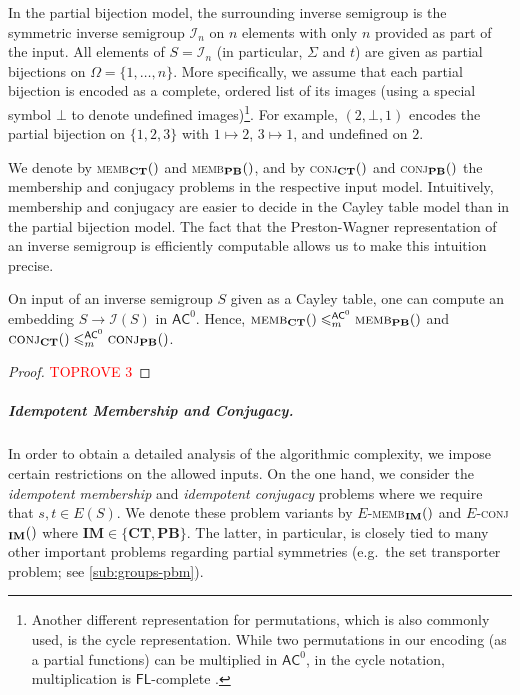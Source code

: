 \documentclass[anonymous,letter,UKenglish,cleveref,autoref,thm-restate]{lipics-v2021}
\renewcommand{\leq}{\leqslant}
\newcommand{\eg}{e.g.~}
\newcommand{\ACz}{\ensuremath{\mathsf{AC}^0}\xspace}
\newcommand{\ISym}{\cI}
\newcommand{\cI}{\mathcal{I}}
\theoremstyle{plain}
\theoremstyle{plain}
\newcommand{\dMemb}[2][]{\textup{\textsc{memb${}_{\mathbf{#1}}\expandafter\ifx\expandafter\relax\detokenize{#2}\relax\else(#2)\fi$}}}
\newcommand{\dConj}[2][]{\textup{\textsc{conj${}_{\mathbf{#1}}\expandafter\ifx\expandafter\relax\detokenize{#2}\relax\else(#2)\fi$}}}
\newcommand{\dEMemb}[2][]{\ensuremath{E}\textnormal{-}\dMemb[#1]{#2}}
\newcommand{\dEConj}[2][]{\ensuremath{E}\textnormal{-}\dConj[#1]{#2}}
\newcommand{\mysubparagraph}[1]{\vspace*{-2mm}\subparagraph*{#1}}
\begin{document}
In the partial bijection model, the surrounding inverse semigroup is the symmetric inverse semigroup $\ISym_n$ on $n$ elements with only $n$ provided as part of the input.
All elements of $S = \ISym_n$ (in particular, $\Sigma$ and $t$) are given as partial bijections on $\Omega = \{ 1, \dotsc, n\}$.
More specifically, we assume that each partial bijection is encoded as a complete, ordered list of its images (using a special symbol $\bot$ to denote undefined images)\footnote{Another different representation for permutations, which is also commonly used, is the cycle representation. While two permutations in our encoding (as a partial functions) can be multiplied in \ACz, in the cycle notation, multiplication is $\mathsf{FL}$-complete \cite{CookM87}.}.
For example, $(2,\bot,1)$ encodes the partial bijection on $\{1,2,3\}$ with $1 \mapsto 2$, $3 \mapsto 1$, and undefined on $2$.

We denote by \dMemb[CT]{} and \dMemb[PB]{}, and by \dConj[CT]{} and \dConj[PB]{} the membership and conjugacy problems in the respective input model.
Intuitively, membership and conjugacy are easier to decide in the Cayley table model than in the partial bijection model. 
The fact that the Preston-Wagner representation \cite{Preston54,Wagner52} of an inverse semigroup is efficiently computable allows us to make this intuition precise.

\begin{lemma}\label{lem:CT_to_PB}
  On input of an inverse semigroup $S$ given as a Cayley table, one can compute an embedding $S \to \ISym(S)$ in \ACz.
  Hence, $\dMemb[CT]{} \leq^{\ACz}_m \dMemb[PB]{}$ and $\dConj[CT]{} \leq^{\ACz}_m \dConj[PB]{}$.
\end{lemma}

\begin{proof}\textcolor{red}{TOPROVE 3}\end{proof}


\mysubparagraph{Idempotent Membership and Conjugacy.}
In order to obtain a detailed analysis of the algorithmic complexity, we impose certain restrictions on the allowed inputs.
On the one hand, we consider the \emph{idempotent membership} and \emph{idempotent conjugacy} problems where we require that $s,t \in E(S)$.
We denote these problem variants by \dEMemb[IM]{} and \dEConj[IM]{} where $\mathbf{IM} \in \{\mathbf{CT}, \mathbf{PB}\}$.
The latter, in particular, is closely tied to many other important problems regarding partial symmetries (\eg the set transporter problem; see \cref{sub:groups-pbm}).
\end{document}
